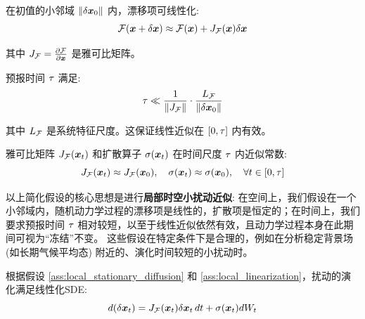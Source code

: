 \begin{assumption}[局部线性化]
\label{ass:local_linearization}
    在初值的小邻域 $\|\delta\bm{x}_0\|$ 内，漂移项可线性化:
    \begin{equation}
    \label{eq:local_linearization}
        \mathcal{F}(\bm{x} + \delta\bm{x}) \approx \mathcal{F}(\bm{x}) + J_{\mathcal{F}}(\bm{x}) \delta\bm{x}
    \end{equation}

    其中 $J_{\mathcal{F}} = \frac{\partial \mathcal{F}}{\partial \bm{x}}$ 是雅可比矩阵。
\end{assumption}

\begin{assumption}[适度时间尺度]
\label{ass:moderate_time_scale}
    预报时间 $\tau$ 满足:
    \begin{equation}
    \label{eq:moderate_time_scale}
        \tau \ll \frac{1}{\|J_{\mathcal{F}}\|} \cdot \frac{L_{\mathcal{F}}}{\|\delta\bm{x}_0\|}
    \end{equation}

    其中 $L_{\mathcal{F}}$ 是系统特征尺度。这保证线性近似在 $[0, \tau]$ 内有效。
\end{assumption}

\begin{assumption}[缓变场假设]
\label{ass:slowly_varying_fields}
    雅可比矩阵 $J_{\mathcal{F}}(\bm{x}_t)$ 和扩散算子 $\sigma(\bm{x}_t)$ 在时间尺度 $\tau$ 内近似常数:
    \begin{equation}
    \label{eq:slowly_varying_fields}
        J_{\mathcal{F}}(\bm{x}_t) \approx J_{\mathcal{F}}(\bm{x}_0), \quad \sigma(\bm{x}_t) \approx \sigma(\bm{x}_0), \quad \forall t \in [0, \tau]
    \end{equation}
\end{assumption}

以上简化假设的核心思想是进行\textbf{局部时空小扰动近似}: 在空间上，我们假设在一个小邻域内，随机动力学过程的漂移项是线性的，扩散项是恒定的；在时间上，我们要求预报时间 $\tau$ 相对较短，以至于线性近似依然有效，且动力学过程本身在此期间可视为“冻结”不变。
这些假设在特定条件下是合理的，例如在分析稳定背景场 (如长期气候平均态) 附近的、演化时间较短的小扰动时。

根据假设 \ref{ass:local_stationary_diffusion} 和 \ref{ass:local_linearization}，扰动的演化满足线性化SDE:
\begin{equation}
\label{eq:linearized_sde}
    d(\delta\bm{x}_t) = J_{\mathcal{F}}(\bm{x}_t) \delta\bm{x}_t\,dt + \sigma(\bm{x}_t) dW_t
\end{equation}

